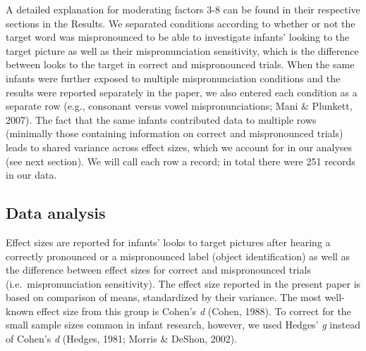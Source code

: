 \documentclass[man]{apa6}
\theoremstyle{definition}
\theoremstyle{definition}
\theoremstyle{definition}
\theoremstyle{remark}
\begin{document}
A detailed explanation for moderating factors 3-8 can be found in their
respective sections in the Results. We separated conditions according to
whether or not the target word was mispronounced to be able to
investigate infants' looking to the target picture as well as their
mispronunciation sensitivity, which is the difference between looks to
the target in correct and mispronounced trials. When the same infants
were further exposed to multiple mispronunciation conditions and the
results were reported separately in the paper, we also entered each
condition as a separate row (e.g., consonant versus vowel
mispronunciations; Mani \& Plunkett, 2007). The fact that the same
infants contributed data to multiple rows (minimally those containing
information on correct and mispronounced trials) leads to shared
variance across effect sizes, which we account for in our analyses (see
next section). We will call each row a record; in total there were 251
records in our data.

\subsection{Data analysis}\label{data-analysis}

Effect sizes are reported for infants' looks to target pictures after
hearing a correctly pronounced or a mispronounced label (object
identification) as well as the difference between effect sizes for
correct and mispronounced trials (i.e.~mispronunciation sensitivity).
The effect size reported in the present paper is based on comparison of
means, standardized by their variance. The most well-known effect size
from this group is Cohen's \emph{d} (Cohen, 1988). To correct for the
small sample sizes common in infant research, however, we used Hedges'
\emph{g} instead of Cohen's \emph{d} (Hedges, 1981; Morris \& DeShon,
2002).
\end{document}
